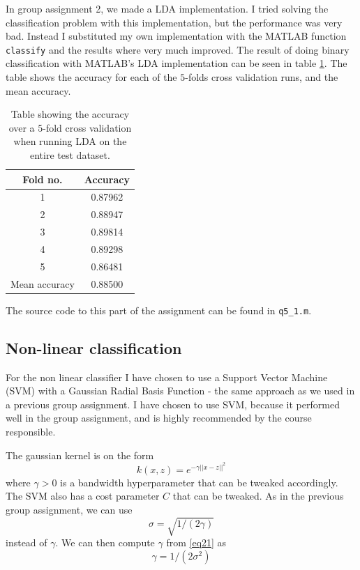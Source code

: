 \documentclass[10pt]{article}
\begin{document}
In group assignment 2, we made a LDA implementation\cite{assignment2}. I tried solving the classification problem with this implementation, but the performance was very bad. Instead I substituted my own implementation with the MATLAB function \texttt{classify} and the results where very much improved. The result of doing binary classification with MATLAB's LDA implementation can be seen in table \ref{table10}. The table shows the accuracy for each of the $5$-folds cross validation runs, and the mean accuracy.

\begin{table}
  \begin{center}  
    \begin{tabular}{ | c | c |}
      \hline
      Fold no. & Accuracy\\
      \hline
      1    &     0.87962\\
      2    &     0.88947\\
      3    &     0.89814\\
      4    &     0.89298\\
      5    &     0.86481\\
      \hline
      Mean accuracy &  0.88500\\
      \hline
    \end{tabular}
    \caption{Table showing the accuracy over a $5$-fold cross validation when running LDA on the entire test dataset.}
    \label{table10}
  \end{center}    
\end{table}   

The source code to this part of the assignment can be found in \texttt{q5\_1.m}.



\subsection*{Non-linear classification} %
\label{sub:non_linear_classification}
For the non linear classifier I have chosen to use a Support Vector Machine (SVM) with a Gaussian Radial Basis Function - the same approach as we used in a previous group assignment\cite{assignment3}. I have chosen to use SVM, because it performed well in the group assignment, and is highly recommended by the course responsible.

The gaussian kernel is on the form 
\begin{equation}
  k(x,z) = e^{-\gamma||x-z||^2}
\end{equation}
where $\gamma>0$ is a bandwidth hyperparameter that can be tweaked accordingly. The SVM also has a cost parameter $C$ that can be tweaked. As in the previous group assignment, we can use 
\begin{equation}
  \sigma = \sqrt{1/(2\gamma)}
  \label{eq21}
\end{equation}
instead of $\gamma$. We can then compute $\gamma$ from \ref{eq21} as
\begin{equation}
  \gamma = 1/(2\sigma^2)  
\end{equation} 
\end{document}
